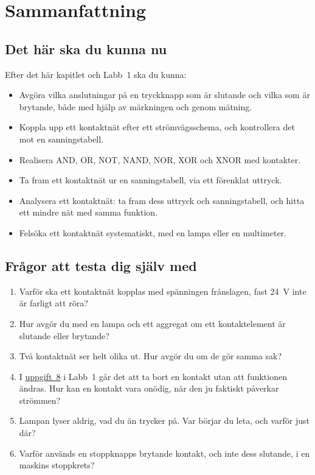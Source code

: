
\section{Sammanfattning}
\label{c3:sec:summary}

\subsection*{Det här ska du kunna nu}
Efter det här kapitlet och Labb~1 ska du kunna:
\begin{itemize}
  \item Avgöra vilka anslutningar på en tryckknapp som är slutande och vilka som är brytande, både
    med hjälp av märkningen och genom mätning.
  \item Koppla upp ett kontaktnät efter ett strömvägsschema, och kontrollera det mot en
    sanningstabell.
  \item Realisera AND, OR, NOT, NAND, NOR, XOR och XNOR med kontakter.
  \item Ta fram ett kontaktnät ur en sanningstabell, via ett förenklat uttryck.
  \item Analysera ett kontaktnät: ta fram dess uttryck och sanningstabell, och hitta ett mindre nät
    med samma funktion.
  \item Felsöka ett kontaktnät systematiskt, med en lampa eller en multimeter.
\end{itemize}

\subsection*{Frågor att testa dig själv med}
\begin{enumerate}
  \item Varför ska ett kontaktnät kopplas med spänningen frånslagen, fast 24~V inte är farligt att
    röra?
  \item Hur avgör du med en lampa och ett aggregat om ett kontaktelement är slutande eller brytande?
  \item Två kontaktnät ser helt olika ut. Hur avgör du om de gör samma sak?
  \item I \hyperref[lab1:u8]{uppgift~8} i Labb~1 går det att ta bort en kontakt utan att funktionen
    ändras. Hur kan en kontakt vara onödig, när den ju faktiskt påverkar strömmen?
  \item Lampan lyser aldrig, vad du än trycker på. Var börjar du leta, och varför just där?
  \item Varför används en stoppknapps brytande kontakt, och inte dess slutande, i en maskins
    stoppkrets?
\end{enumerate}

